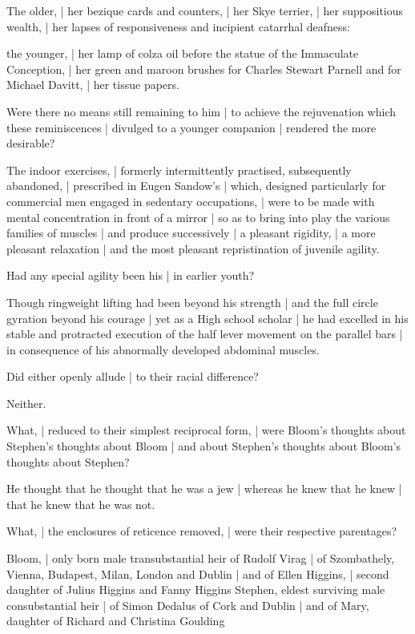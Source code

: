 \Bloom
The older, |
her bezique cards and counters, |
her Skye terrier, |
her suppositious wealth, |
her lapses of responsiveness and incipient catarrhal deafness:

\Stephen
the younger, |
her lamp of colza oil before the statue of the Immaculate Conception, |
her green and maroon brushes for Charles Stewart Parnell and for Michael Davitt, |
her tissue papers.


Were there no means still remaining to him |
to achieve the rejuvenation which these reminiscences |
divulged to a younger companion |
rendered the more desirable?

\Science
The indoor exercises, |
formerly intermittently practised, subsequently abandoned, |
prescribed in Eugen Sandow's
 |
which, designed particularly for commercial men engaged in sedentary occupations, |
were to be made with mental concentration
in front of a mirror |
so as to bring into play the various families of muscles |
and produce successively |
a pleasant rigidity, |
a more pleasant relaxation |
and the most pleasant repristination of juvenile agility.


Had any special agility been his |
in earlier youth?

\Memories
Though ringweight lifting had been beyond his strength |
and the full circle gyration beyond his courage |
yet as a High school scholar |
he had excelled in his stable and protracted execution
of the half lever movement on the parallel bars |
in consequence of his abnormally developed abdominal muscles.


Did either openly allude |
to their racial difference?

\Factual
Neither.



What, |
reduced to their simplest reciprocal form, |
were Bloom's thoughts about Stephen's thoughts about Bloom |
and about Stephen's thoughts about Bloom's thoughts about Stephen?

\Philosophy
He thought that he thought that he was a jew |
whereas he knew that he knew |
that he knew that he was not.


What, |
the enclosures of reticence removed, |
were their respective parentages?

\Factual[~(legal)]
Bloom, |
only born male transubstantial heir of Rudolf Virag
 |
of Szombathely, Vienna, Budapest, Milan, London and Dublin |
and of Ellen Higgins, |
second daughter of Julius Higgins
and Fanny Higgins
Stephen, eldest surviving male consubstantial heir |
of Simon Dedalus of Cork and Dublin |
and of Mary, daughter of Richard and Christina Goulding


